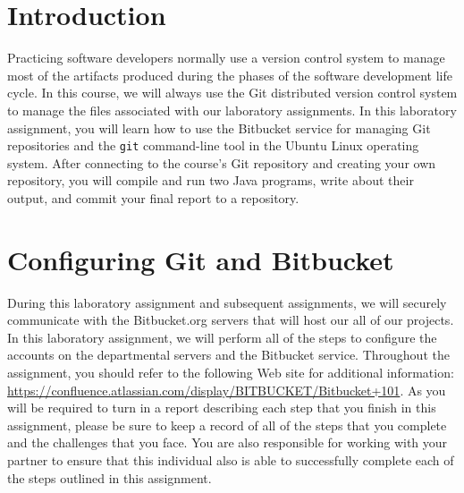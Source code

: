 


\usepackage[compact]{titlesec}



\section*{Introduction}

Practicing software developers normally use a version control system to manage most of the artifacts produced during the
phases of the software development life cycle.  In this course, we will always use the Git distributed version control
system to manage the files associated with our laboratory assignments.  In this laboratory assignment, you will learn
how to use the Bitbucket service for managing Git repositories and the {\tt git} command-line tool in the Ubuntu Linux
operating system. After connecting to the course's Git repository and creating your own repository, you will compile and
run two Java programs, write about their output, and commit your final report to a repository.

\section*{Configuring Git and Bitbucket}

During this laboratory assignment and subsequent assignments, we will securely communicate with the Bitbucket.org
servers that will host our all of our projects.  In this laboratory assignment, we will perform all of the steps to
configure the accounts on the departmental servers and the Bitbucket service.  Throughout the assignment, you should
refer to the following Web site for additional information:
\url{https://confluence.atlassian.com/display/BITBUCKET/Bitbucket+101}.  As you will be required to turn in a report 
describing each step that you finish in this assignment, please be sure to keep a record of all of the steps that you
complete and the challenges that you face.  You are also responsible for working with your partner to ensure that
this individual also is able to successfully complete each of the steps outlined in this assignment.

